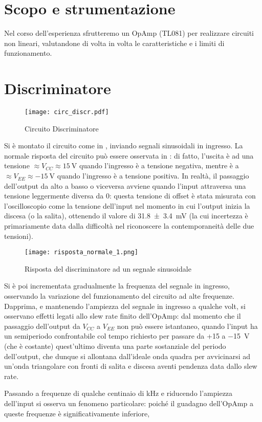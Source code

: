 \section{Scopo e strumentazione}

Nel corso dell'esperienza sfrutteremo un OpAmp (TL081) per realizzare circuiti non lineari, valutandone di volta in volta le caratteristiche e i limiti di funzionamento.

\section{Discriminatore}

\begin{figure}[h]
	\centering
	\texttt{[image: circ\_discr.pdf]}
	\caption{Circuito Discriminatore}
	\label{f:discr}
\end{figure}

Si è montato il circuito come in , inviando segnali sinusoidali in ingresso. La normale risposta del circuito può essere osservata in : di fatto, l'uscita è ad una tensione $\approx V_{CC} \approx \SI{15}{\V}$ quando l'ingresso è a tensione negativa, mentre è a $\approx V_{EE} \approx \SI{-15}{\V}$ quando l'ingresso è a tensione positiva. In realtà, il passaggio dell'output da alto a basso o viceversa avviene quando l'input attraversa una tensione leggermente diversa da 0: questa tensione di offset è stata misurata con l'oscilloscopio come la tensione dell'input nel momento in cui l'output inizia la discesa (o la salita), ottenendo il valore di \SI{31.8(34)}{\mV} (la cui incertezza è primariamente data dalla difficoltà nel riconoscere la contemporaneità delle due tensioni).

\begin{figure}
	\centering
	\texttt{[image: risposta\_normale\_1.png]}
	\caption{Risposta del discriminatore ad un segnale sinusoidale}
	\label{f:discr_normale}
\end{figure}

Si è poi incrementata gradualmente la frequenza del segnale in ingresso, osservando la variazione del funzionamento del circuito ad alte frequenze.
Dapprima, e mantenendo l'ampiezza del segnale in ingresso a qualche volt, si osservano effetti legati allo slew rate finito dell'OpAmp: dal momento che il passaggio dell'output da $V_{CC}$ a $V_{EE}$ non può essere istantaneo, quando l'input ha un semiperiodo confrontabile col tempo richiesto per passare da +15 a \SI{-15}{\V} (che è costante) quest'ultimo diventa una parte sostanziale del periodo dell'output, che dunque si allontana dall'ideale onda quadra per avvicinarsi ad un'onda triangolare con fronti di salita e discesa aventi pendenza data dallo slew rate. %

Passando a frequenze di qualche centinaio di \si{\kHz} e riducendo l'ampiezza dell'input si osserva un fenomeno particolare: poiché il guadagno dell'OpAmp a queste frequenze è significativamente inferiore, 
